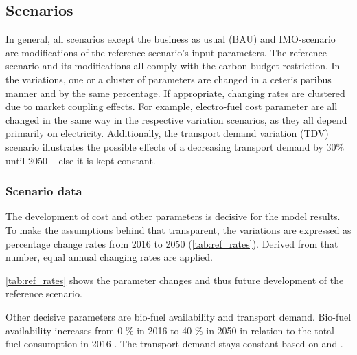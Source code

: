\documentclass[article]{elsarticle}
\begin{document}
\subsection{Scenarios}
\label{subsec:Sce}
In general, all scenarios except the business as usual (BAU) and IMO-scenario are modifications of the reference scenario's input parameters. The reference scenario and its modifications all comply with the carbon budget restriction. In the variations, one or a cluster of parameters are changed in a ceteris paribus manner and by the same percentage. If appropriate, changing rates are clustered due to market coupling effects. For example, electro-fuel cost parameter are all changed in the same way in the respective variation scenarios, as they all depend primarily on electricity. Additionally, the transport demand variation (TDV) scenario illustrates the possible effects of a decreasing transport demand by 30\% until 2050 -- else it is kept constant.

\subsubsection{Scenario data}
The development of cost and other parameters is decisive for the model results. To make the assumptions behind that transparent, the variations are expressed as percentage change rates from 2016 to 2050 (\autoref{tab:ref_rates}). Derived from that number, equal annual changing rates are applied.

\autoref{tab:ref_rates} shows the parameter changes and thus future development of the reference scenario.

Other decisive parameters are bio-fuel availability and transport demand. Bio-fuel availability increases from 0 \% in 2016 to 40 \% in 2050 in relation to the total fuel consumption in 2016 \cite{DEA2016}. The transport demand stays constant based on \cite[p.~18]{ITF2018} and \cite[p.~19]{Rex2017}.
\end{document}

